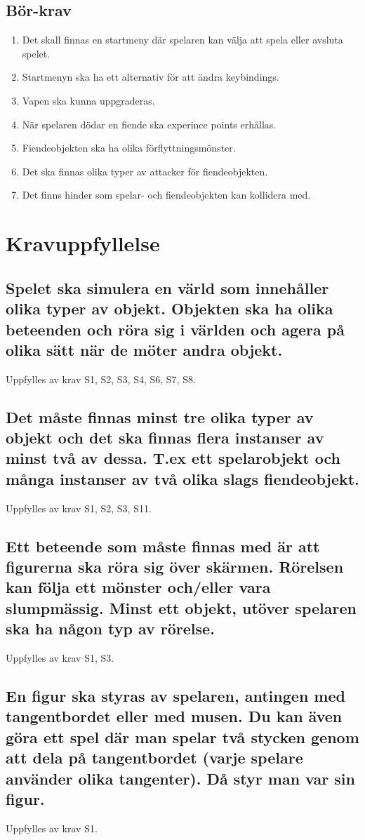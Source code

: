 \documentclass{TDP005mall}
\begin{document}
  \subsection{Bör-krav}
  \begin{enumerate}[label=B\arabic*]
    \item Det skall finnas en startmeny där spelaren kan välja att spela eller avsluta spelet.
    \item Startmenyn ska ha ett alternativ för att ändra keybindings.
    \item Vapen ska kunna uppgraderas.
    \item När spelaren dödar en fiende ska experince points erhållas.
    \item Fiendeobjekten ska ha olika förflyttningsmönster.
    \item Det ska finnas olika typer av attacker för fiendeobjekten.
    \item Det finns hinder som spelar- och fiendeobjekten kan kollidera med.
  \end{enumerate}

  \section{Kravuppfyllelse}

  \subsection{Spelet ska simulera en värld som innehåller olika typer av objekt. Objekten ska ha olika beteenden och röra sig i världen och agera på olika sätt när de möter andra objekt.}
  Uppfylles av krav S1, S2, S3, S4, S6, S7, S8.
  \subsection{Det måste finnas minst tre olika typer av objekt och det ska finnas flera instanser av minst två av dessa. T.ex ett spelarobjekt och många instanser av två olika slags fiendeobjekt.}
  Uppfylles av krav S1, S2, S3, S11.
  \subsection{Ett beteende som måste finnas med är att figurerna ska röra sig över skärmen. Rörelsen kan följa ett mönster och/eller vara slumpmässig. Minst ett objekt, utöver spelaren ska ha någon typ av rörelse.}
  Uppfylles av krav S1, S3.
  \subsection{En figur ska styras av spelaren, antingen med tangentbordet eller med musen. Du kan även göra ett spel där man spelar två stycken genom att dela på tangentbordet (varje spelare använder olika tangenter). Då styr man var sin figur.}
  Uppfylles av krav S1.
\end{document}
